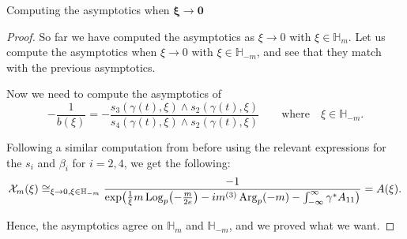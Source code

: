 \documentclass[11pt]{article}
\numberwithin{equation}{section}
\numberwithin{equation}{section}
\newcommand{\MC}{\mathcal{X}_m}
\begin{document}
\begin{subsubsection}{Computing the asymptotics when $\boldsymbol{\xi \to 0}$}
\begin{proof}
So far we have computed the asymptotics as $\xi \to 0$ with $\xi \in \mathbb{H}_m$. Let us compute the asymptotics when $\xi \to 0$ with $\xi \in \mathbb{H}_{-m}$, and see that they match with the previous asymptotics.

Now we need to compute the asymptotics of
\begin{equation*}
-\frac{1}{b(\xi)}=-\frac{s_3(\gamma(t),\xi)\wedge s_2 (\gamma(t),\xi)}{s_4(\gamma(t),\xi)\wedge s_2(\gamma(t),\xi)}\qquad \text{where} \quad \xi \in \mathbb{H}_{-m}.
\end{equation*}

Following a similar computation from before using the relevant expressions for the $s_i$ and $\beta_i$ for $i=2,4$, we get the following:
\begin{equation*}
 \MC(\xi)\cong_{\xi \to 0, \xi \in \mathbb{H}_{-m}} \frac{-1}{\exp \bigl(\frac{1}{\xi}m \operatorname{Log}_p\bigl(-\frac{m}{2e}\bigr)-{\rm i}m^{(3)}\operatorname{Arg}_p(-m)-\int_{-\infty}^{\infty}\gamma^*A_{11}\bigr)}=A(\xi).
\end{equation*}

Hence, the asymptotics agree on $\mathbb{H}_m$ and $\mathbb{H}_{-m}$, and we proved what we want.
\end{proof}
\end{subsubsection}
\end{document}
